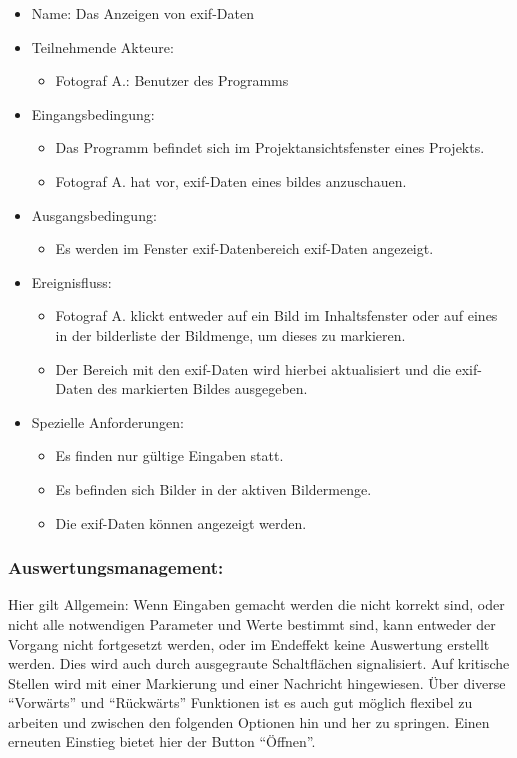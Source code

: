 \begin{itemize}
	\begin{itemize}
		\item Name: Das Anzeigen von \gls{exif}-Daten
		\item Teilnehmende Akteure:
		\begin{itemize}
			\item	Fotograf A.: Benutzer des Programms		
		\end{itemize}
		\item Eingangsbedingung:
		\begin{itemize}
			\item	Das Programm befindet sich im Projektansichtsfenster eines Projekts.
			\item Fotograf A. hat vor, \gls{exif}-Daten eines bildes anzuschauen.
		\end{itemize}
		\item Ausgangsbedingung:
		\begin{itemize}
			\item	Es werden im Fenster \gls{exif}-Datenbereich \gls{exif}-Daten angezeigt.	
		\end{itemize}
		\item Ereignisfluss:
		\begin{itemize}
			\item Fotograf A. klickt entweder auf ein Bild im Inhaltsfenster oder auf eines in der bilderliste der Bildmenge, um dieses zu markieren.
			\item Der Bereich mit den \gls{exif}-Daten wird hierbei aktualisiert und die \gls{exif}-Daten des markierten Bildes ausgegeben.
		\end{itemize}
		\item Spezielle Anforderungen:
		\begin{itemize}
			\item	Es finden nur gültige Eingaben statt.
			\item Es befinden sich Bilder in der aktiven Bildermenge.
			\item Die \gls{exif}-Daten können angezeigt werden.			
		\end{itemize}			
	\end{itemize}
		
	\subsubsection{Auswertungsmanagement:}
Hier gilt Allgemein: Wenn Eingaben gemacht werden die nicht korrekt sind, oder nicht alle notwendigen Parameter und Werte bestimmt sind, kann entweder der Vorgang nicht fortgesetzt werden, oder im Endeffekt keine Auswertung erstellt werden. Dies wird auch durch ausgegraute Schaltflächen signalisiert. Auf kritische Stellen wird mit einer Markierung und einer Nachricht hingewiesen. Über diverse "`Vorwärts"' und "`Rückwärts"' Funktionen ist es auch gut möglich flexibel zu arbeiten und zwischen den folgenden Optionen hin und her zu springen. Einen erneuten Einstieg bietet hier der Button "`Öffnen"'.
 

\end{itemize}
